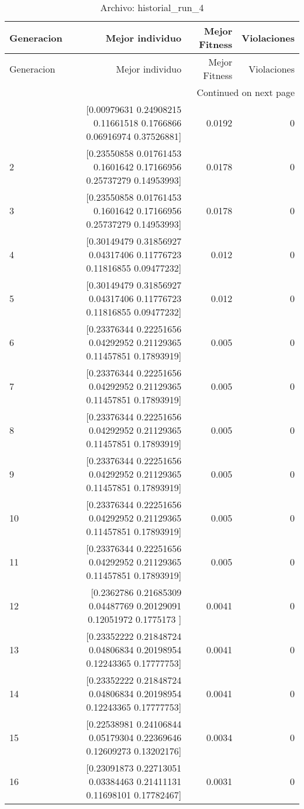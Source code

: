 \begin{longtable}{lrrr}
\caption{Archivo: historial\_run\_4}\label{tab:historial_run_4} \\
\toprule
Generacion & Mejor individuo & Mejor Fitness & Violaciones \\
\midrule
\endfirsthead
\toprule
Generacion & Mejor individuo & Mejor Fitness & Violaciones \\
\midrule
\endhead
\midrule
\multicolumn{4}{r}{Continued on next page} \\
\midrule
\endfoot
\bottomrule
\endlastfoot
1 & [0.00979631 0.24908215 0.11661518 0.1766866  0.06916974 0.37526881] & 0.0192 & 0 \\
2 & [0.23550858 0.01761453 0.1601642  0.17166956 0.25737279 0.14953993] & 0.0178 & 0 \\
3 & [0.23550858 0.01761453 0.1601642  0.17166956 0.25737279 0.14953993] & 0.0178 & 0 \\
4 & [0.30149479 0.31856927 0.04317406 0.11776723 0.11816855 0.09477232] & 0.012 & 0 \\
5 & [0.30149479 0.31856927 0.04317406 0.11776723 0.11816855 0.09477232] & 0.012 & 0 \\
6 & [0.23376344 0.22251656 0.04292952 0.21129365 0.11457851 0.17893919] & 0.005 & 0 \\
7 & [0.23376344 0.22251656 0.04292952 0.21129365 0.11457851 0.17893919] & 0.005 & 0 \\
8 & [0.23376344 0.22251656 0.04292952 0.21129365 0.11457851 0.17893919] & 0.005 & 0 \\
9 & [0.23376344 0.22251656 0.04292952 0.21129365 0.11457851 0.17893919] & 0.005 & 0 \\
10 & [0.23376344 0.22251656 0.04292952 0.21129365 0.11457851 0.17893919] & 0.005 & 0 \\
11 & [0.23376344 0.22251656 0.04292952 0.21129365 0.11457851 0.17893919] & 0.005 & 0 \\
12 & [0.2362786  0.21685309 0.04487769 0.20129091 0.12051972 0.1775173 ] & 0.0041 & 0 \\
13 & [0.23352222 0.21848724 0.04806834 0.20198954 0.12243365 0.17777753] & 0.0041 & 0 \\
14 & [0.23352222 0.21848724 0.04806834 0.20198954 0.12243365 0.17777753] & 0.0041 & 0 \\
15 & [0.22538981 0.24106844 0.05179304 0.22369646 0.12609273 0.13202176] & 0.0034 & 0 \\
16 & [0.23091873 0.22713051 0.03384463 0.21411131 0.11698101 0.17782467] & 0.0031 & 0 \\

\end{longtable}
